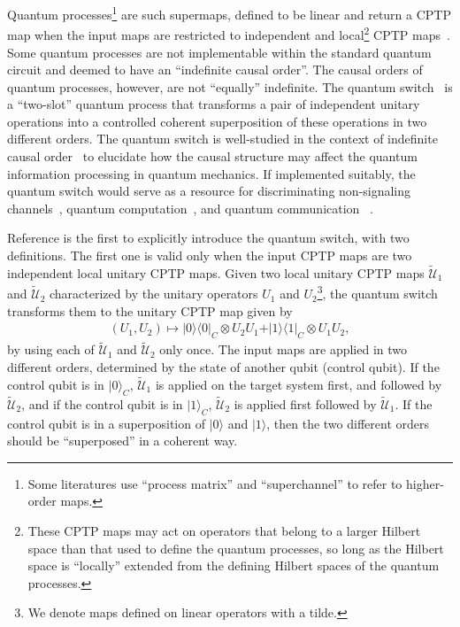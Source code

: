 \documentclass[a4paper,twocolumn,accepted=2022-10-23]{quantumarticle}
\newcommand{\ket}[1]{\vert {#1} \rangle}
\newcommand{\proj}[1]{\vert {#1} \rangle\!\langle {#1} \vert}
\newcommand{\tmap}[1]{\widetilde{\mbox{$\mathcal{#1}$}}}
\theoremstyle{definition}
\begin{document}
Quantum processes\footnote{Some literatures use ``process matrix'' and ``superchannel'' to refer to higher-order maps.} are such supermaps, defined to be linear and return a CPTP map when the input maps are restricted to independent and local\footnote{These CPTP maps may act on operators that belong to a larger Hilbert space than that used to define the quantum processes, so long as the Hilbert space is ``locally'' extended from the defining Hilbert spaces of the quantum processes.} CPTP maps~\cite{indefinite_correlation,indefinite_purification}. Some quantum processes are not implementable within the standard quantum circuit and deemed to have an ``indefinite causal order''.
The causal orders of quantum processes, however, are not ``equally'' indefinite.
The quantum switch~\cite{qswitch} is a ``two-slot'' quantum process that transforms a pair of independent unitary operations into a controlled coherent superposition of these operations in two different orders. 
The quantum switch is well-studied in the context of indefinite causal order~\cite{qswitch,indefinite_correlation,indefinite_purification} to elucidate how the causal structure may affect the quantum information processing in quantum mechanics.
If implemented suitably, the quantum switch would serve as a resource for discriminating non-signaling channels~\cite{qs_discrimination1}, quantum computation~\cite{qs_discrimination2}, and quantum communication ~\cite{qs_comm_tri,qs_comm1,qs_comm2,qs_comm3,qs_comm_exp1,qs_comm_exp2}.

Reference \cite{qswitch} is the first to explicitly introduce the quantum switch, with two definitions.  The first one is valid only when the input CPTP maps are two independent local unitary CPTP maps.
Given two local unitary CPTP maps $\tmap{U}_1$ and $\tmap{U}_2$ characterized by the unitary operators $U_1$ and $U_2$\footnote{
We denote maps defined on linear operators with a tilde.},
the quantum switch transforms them to the unitary CPTP map given by
\begin{align}
(U_1 , U_2) \mapsto \proj{0}_C \otimes U_2 U_1 + \proj{1}_C \otimes U_1 U_2, \label{eq:def_qs_u}
\end{align}
by using each of $\tmap{U}_1$ and $\tmap{U}_2$ only once.  The input maps are applied in two different orders, determined by the state of another qubit (control qubit).
If the control qubit is in $\ket{0}_C$, $\tmap{U}_1$ is applied on the target system first, and followed by $\tmap{U}_2$,
and if the control qubit is in $\ket{1}_C$, $\tmap{U}_2$ is applied first followed by $\tmap{U}_1$.
If the control qubit is in a superposition of $\ket{0}$ and $\ket{1}$, then the two different orders should be ``superposed'' in a coherent way.
\end{document}
